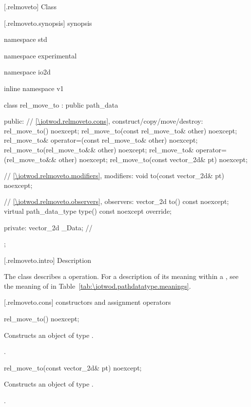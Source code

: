  [\iotwod.relmoveto] {Class }

 [\iotwod.relmoveto.synopsis] { synopsis}

\begin{codeblock}
namespace std { namespace experimental { namespace io2d { inline namespace v1 {
  class rel_move_to : public path_data {
  public:
    // \ref{\iotwod.relmoveto.cons}, construct/copy/move/destroy:
    rel_move_to() noexcept;
    rel_move_to(const rel_move_to& other) noexcept;
    rel_move_to& operator=(const rel_move_to& other) noexcept;
    rel_move_to(rel_move_to&& other) noexcept;
    rel_move_to& operator=(rel_move_to&& other) noexcept;
    rel_move_to(const vector_2d& pt) noexcept;

    // \ref{\iotwod.relmoveto.modifiers}, modifiers:
    void to(const vector_2d& pt) noexcept;

    // \ref{\iotwod.relmoveto.observers}, observers:
    vector_2d to() const noexcept;
    virtual path_data_type type() const noexcept override;
    
  private:
    vector_2d _Data; // \expos
  };
} } } }
\end{codeblock}

 [\iotwod.relmoveto.intro] { Description}

\pnum
{}
The class  describes a  operation. For a description of its meaning within a , see the meaning of  in Table~\ref{tab:\iotwod.pathdatatype.meanings}.

 [\iotwod.relmoveto.cons] { constructors and assignment operators}

\begin{itemdecl}
    rel_move_to() noexcept;
\end{itemdecl}
\begin{itemdescr}
	\pnum
	\effects
	Constructs an object of type .
	
	\pnum
	\postconditions
	.
\end{itemdescr}

\begin{itemdecl}
    rel_move_to(const vector_2d& pt) noexcept;
\end{itemdecl}
\begin{itemdescr}
	\pnum
	\effects
	Constructs an object of type .
	
	\pnum
	\postconditions
	.
\end{itemdescr}

